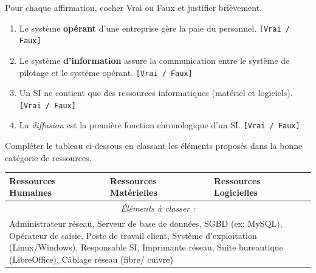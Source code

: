\documentclass[11pt]{article}
\begin{document}
\begin{exercice}
Pour chaque affirmation, cocher Vrai ou Faux et justifier brièvement.
\begin{enumerate}
    \item Le système \textbf{opérant} d'une entreprise gère la paie du personnel. \hfill \texttt{[Vrai / Faux]} \\
    \par\noindent\hspace*{0.5cm}\parbox[t]{\dimexpr\linewidth-0.5cm\relax}{\rule{0pt}{2.5cm}}
    \item Le système \textbf{d'information} assure la communication entre le système de pilotage et le système opérant. \hfill \texttt{[Vrai / Faux]} \\
    \par\noindent\hspace*{0.5cm}\parbox[t]{\dimexpr\linewidth-0.5cm\relax}{\rule{0pt}{2.5cm}}
    \item Un SI ne contient que des ressources informatiques (matériel et logiciels). \hfill \texttt{[Vrai / Faux]} \\
    \par\noindent\hspace*{0.5cm}\parbox[t]{\dimexpr\linewidth-0.5cm\relax}{\rule{0pt}{2.5cm}}
    \item La \textit{diffusion} est la première fonction chronologique d'un SI. \hfill \texttt{[Vrai / Faux]} \\
    \par\noindent\hspace*{0.5cm}\parbox[t]{\dimexpr\linewidth-0.5cm\relax}{\rule{0pt}{2.5cm}}
\end{enumerate}
\end{exercice}

\begin{exercice}[Composants d'un SI]
Compléter le tableau ci-dessous en classant les éléments proposés dans la bonne catégorie de ressources.
\begin{center}
\begin{tabular}{|p{3.5cm}|p{4cm}|p{4cm}|}
\hline
\textbf{Ressources Humaines} & \textbf{Ressources Matérielles} & \textbf{Ressources Logicielles} \\ \hline
\multicolumn{3}{|c|}{\textit{Éléments à classer :}} \\ \hline
\multicolumn{3}{|p{11.5cm}|}{Administrateur réseau, Serveur de base de données, SGBD (ex: MySQL), Opérateur de saisie, Poste de travail client, Système d'exploitation (Linux/Windows), Responsable SI, Imprimante réseau, Suite bureautique (LibreOffice), Câblage réseau (fibre/ cuivre)} \\ \hline
\end{tabular}
\end{center}
\end{exercice}
\end{document}
